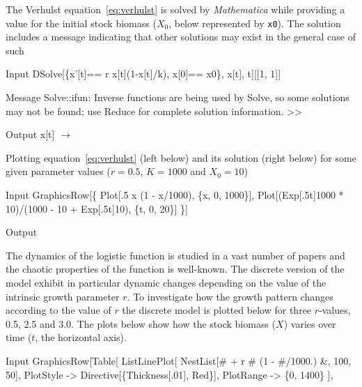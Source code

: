 \documentclass[11pt,fleqn]{book} %
\begin{document}
\begin{theorem}
\hfill \break
The Verhulst equation~\ref{eq:verhulst} is solved by \textit{Mathematica} while providing a value for the initial stock biomass ($X_0$, below represented by \texttt{x0}). The solution includes a message indicating that other solutions may exist in the general case of such
\begin{mmaCell}[index=1]{Input}
  DSolve[\{x'[t]== r x[t](1-x[t]/k), x[0]== x0\}, x[t], t][[1, 1]]
\end{mmaCell}
\begin{mmaCell}[messagelink=message/General/infy]{Message}
  Solve::ifun: Inverse functions are being used by Solve, so some solutions may 
  not be found; use Reduce for complete solution information. >>
\end{mmaCell}
\begin{mmaCell}{Output}
  x[t] \(\to\) 
\end{mmaCell}
Plotting equation~\ref{eq:verhulst} (left below) and its solution (right below) for some given parameter values ($r = 0.5$, $K = 1000$ and $X_0 = 10$)
\begin{mmaCell}{Input}
  GraphicsRow[\{
    Plot[.5 x (1 - x/1000), \{x, 0, 1000\}],
    Plot[(Exp[.5t]1000 * 10)/(1000 - 10 + Exp[.5t]10), \{t, 0, 20\}]
  \}]
\end{mmaCell}
\begin{mmaCell}[moregraphics={moreig={scale=.8}}]{Output}
\end{mmaCell}
The dynamics of the logistic function is studied in a vast number of papers and the chaotic properties of the function is well-known. The discrete version of the model exhibit in particular dynamic changes depending on the value of the intrinsic growth parameter $r$. To investigate how the growth pattern changes according to the value of $r$ the discrete model is plotted below for three $r$-values, 0.5, 2.5 and 3.0. The plots below show how the stock biomass ($X$) varies over time ($t$, the horizontal axis).
\begin{mmaCell}{Input}
  GraphicsRow[Table[
    ListLinePlot[
      NestList[# + r # (1 - #/1000.) &, 100, 50], 
      PlotStyle -> Directive[\{Thickness[.01], Red\}],
      PlotRange -> \{0, 1400\}
    ], 

\end{mmaCell}
\end{theorem}
\end{document}
